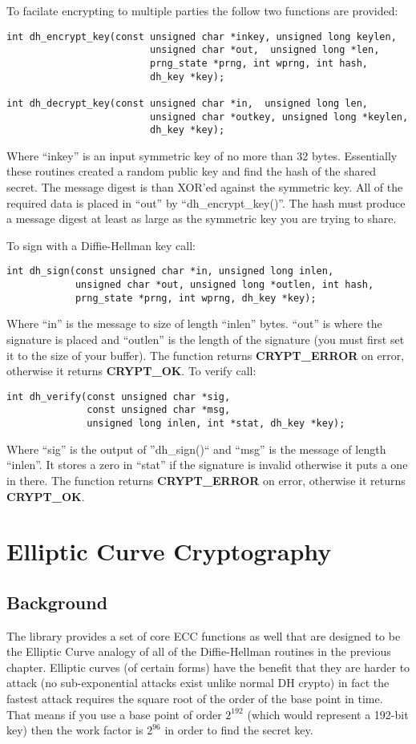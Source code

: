 \documentclass{book}
\begin{document}
To facilate encrypting to multiple parties the follow two functions are provided:
\begin{verbatim}
int dh_encrypt_key(const unsigned char *inkey, unsigned long keylen,
                         unsigned char *out,  unsigned long *len, 
                         prng_state *prng, int wprng, int hash, 
                         dh_key *key);

int dh_decrypt_key(const unsigned char *in,  unsigned long len, 
                         unsigned char *outkey, unsigned long *keylen, 
                         dh_key *key);
\end{verbatim}
Where ``inkey'' is an input symmetric key of no more than 32 bytes.  Essentially these routines created a random public key
and find the hash of the shared secret.  The message digest is than XOR'ed against the symmetric key.  All of the required
data is placed in ``out'' by ``dh\_encrypt\_key()''.   The hash must produce a message digest at least as large
as the symmetric key you are trying to share.

To sign with a Diffie-Hellman key call:
\begin{verbatim}
int dh_sign(const unsigned char *in, unsigned long inlen, 
            unsigned char *out, unsigned long *outlen, int hash, 
            prng_state *prng, int wprng, dh_key *key);
\end{verbatim}
Where ``in'' is the message to size of length ``inlen'' bytes.  ``out'' is where the signature is placed and ``outlen''
is the length of the signature (you must first set it to the size of your buffer).  The function returns {\bf CRYPT\_ERROR} on error, otherwise
it returns {\bf CRYPT\_OK}.  To verify call:
\begin{verbatim}
int dh_verify(const unsigned char *sig, 
              const unsigned char *msg, 
              unsigned long inlen, int *stat, dh_key *key);
\end{verbatim}
Where ``sig'' is the output of ''dh\_sign()`` and ``msg'' is the message of length ``inlen''.  It stores a zero in ``stat''
if the signature is invalid otherwise it puts a one in there.  The function returns {\bf CRYPT\_ERROR} on error, otherwise
it returns {\bf CRYPT\_OK}.

\chapter{Elliptic Curve Cryptography}

\section{Background}
The library provides a set of core ECC functions as well that are designed to be the Elliptic Curve analogy of all of the 
Diffie-Hellman routines in the previous chapter.  Elliptic curves (of certain forms) have the benefit that they are harder
to attack (no sub-exponential attacks exist unlike normal DH crypto) in fact the fastest attack requires the square root
of the order of the base point in time.  That means if you use a base point of order $2^{192}$ (which would represent a
192-bit key) then the work factor is $2^{96}$ in order to find the secret key.
\end{document}

